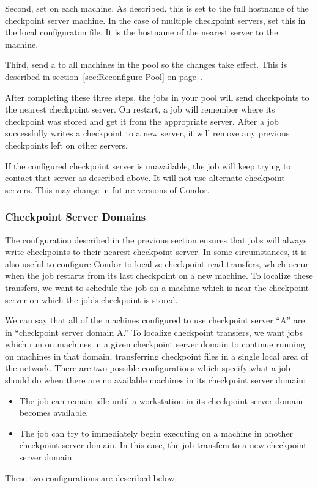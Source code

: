 Second, set  on each machine.
As described, this is set to the full hostname of the
checkpoint server machine.
In the case of multiple checkpoint servers, set this
in the local configuraton file.
It is
the hostname of the nearest server to the machine.

Third, send a
 to all machines in the pool so the changes take
effect.
This is described in section~\ref{sec:Reconfigure-Pool} on
page~\pageref{sec:Reconfigure-Pool}.

After completing these three steps, the jobs in your pool will
send checkpoints to the nearest checkpoint server.
On restart, a job will remember where its checkpoint was
stored and get it from the appropriate server.
After a job successfully writes a checkpoint to a new server, it will
remove any previous checkpoints left on other servers.

\Note If the configured checkpoint server is unavailable, the job will
keep trying to contact that server as described above.
It will not use alternate checkpoint servers.
This may change in future versions of Condor.

\subsubsection{\label{sec:Checkpoint-Server-Domains} 
Checkpoint Server Domains}

The configuration described in the previous section ensures that jobs
will always write checkpoints to their nearest checkpoint server.  In
some circumstances, it is also useful to configure Condor to localize
checkpoint read transfers, which occur when the job restarts from its
last checkpoint on a new machine.  To localize these transfers, we
want to schedule the job on a machine which is near the checkpoint
server on which the job's checkpoint is stored.

We can say that all of the machines configured to use checkpoint
server ``A'' are in ``checkpoint server domain A.''  To localize
checkpoint transfers, we want jobs which run on machines in a given
checkpoint server domain to continue running on machines in that
domain, transferring checkpoint files in a single local area of the
network.  There are two possible configurations which specify what a
job should do when there are no available machines in its checkpoint
server domain:
\begin{itemize}
\item The job can remain idle until a workstation in its checkpoint
server domain becomes available.
\item The job can try to immediately begin executing on a machine
in another checkpoint server domain.  In this case, the job transfers
to a new checkpoint server domain.
\end{itemize}
These two configurations are described below.


